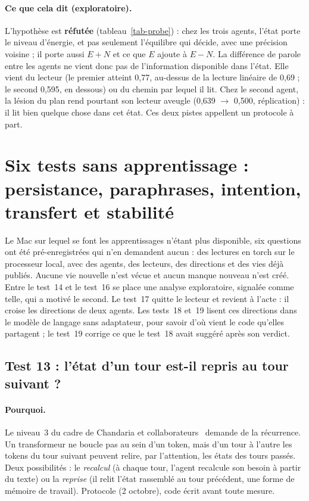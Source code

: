 \documentclass[11pt,a4paper]{article}
\newcommand{\code}[1]{\texttt{\detokenize{#1}}}
\begin{document}
\paragraph{Ce que cela dit (exploratoire).} L'hypothèse est \textbf{réfutée}
(tableau~\ref{tab-probe}) : chez les trois agents, l'état porte le niveau d'énergie,
et pas seulement l'équilibre qui décide, avec une précision voisine ; il porte aussi
$E+N$ et ce que $E$ ajoute à $E-N$. La différence de parole entre les agents ne vient
donc pas de l'information disponible dans l'état. Elle vient du lecteur (le premier
atteint 0,77, au-dessus de la lecture linéaire de 0,69 ; le second 0,595, en dessous)
ou du chemin par lequel il lit. Chez le second agent, la lésion du plan rend pourtant
son lecteur aveugle (0,639 $\to$ 0,500, réplication) : il lit bien quelque chose dans
cet état. Ces deux pistes appellent un protocole à part.

\section[Six tests sans apprentissage : persistance, paraphrases, intention, transfert et stabilité]{Six tests sans apprentissage :\\ persistance, paraphrases, intention, transfert et stabilité}
\label{sec-sansapp}

Le Mac sur lequel se font les apprentissages n'étant plus disponible, six questions
ont été pré-enregistrées qui n'en demandent aucun : des lectures en torch sur le
processeur local, avec des agents, des lecteurs, des directions et des vies déjà
publiés. Aucune vie nouvelle n'est vécue et aucun manque nouveau n'est créé. Entre le
test~14 et le test~16 se place une analyse exploratoire, signalée comme telle, qui a
motivé le second. Le test~17 quitte le lecteur et revient à l'acte : il croise les
directions de deux agents. Les tests~18 et~19 lisent ces directions dans le modèle de langage
sans adaptateur, pour savoir d'où vient le code qu'elles partagent ; le test~19 corrige ce que
le test~18 avait suggéré après son verdict.

\subsection{Test 13 : l'état d'un tour est-il repris au tour suivant ?}
\label{sec-t13}

\paragraph{Pourquoi.} Le niveau~3 du cadre de Chandaria et
collaborateurs~\cite{chandaria2026} demande de la récurrence. Un transformeur ne boucle
pas au sein d'un token, mais d'un tour à l'autre les tokens du tour suivant peuvent
relire, par l'attention, les états des tours passés. Deux possibilités : le
\emph{recalcul} (à chaque tour, l'agent recalcule son besoin à partir du texte) ou la
\emph{reprise} (il relit l'état rassemblé au tour précédent, une forme de mémoire de
travail). Protocole \code{75fda95} (2 octobre), code \code{30c51b9} écrit avant toute
mesure.
\end{document}
